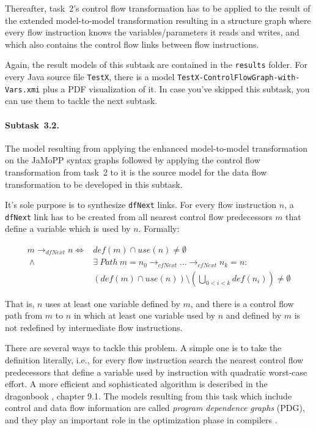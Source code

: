 \documentclass[11pt]{article}
\begin{document}
Thereafter, task~2's control flow transformation has to be applied to the
result of the extended model-to-model transformation resulting in a structure
graph where every flow instruction knows the variables/parameters it reads and
writes, and which also contains the control flow links between flow
instructions.

Again, the result models of this subtask are contained in the \verb|results|
folder.  For every Java source file \verb|TestX|, there is a model
\verb|TestX-ControlFlowGraph-with-Vars.xmi| plus a PDF visualization of it.  In
case you've skipped this subtask, you can use them to tackle the next subtask.


\paragraph{Subtask~3.2.}
\label{sec:subtask-3.2}

The model resulting from applying the enhanced model-to-model transformation on
the JaMoPP syntax graphs followed by applying the control flow transformation
from task~2 to it is the source model for the data flow transformation to be
developed in this subtask.

It's sole purpose is to synthesize \verb|dfNext| links.  For every flow
instruction $n$, a \verb|dfNext| link has to be created from all nearest
control flow predecessors $m$ that define a variable which is used by $n$.
Formally:

\begin{align*}
  m \rightarrow_{dfNext} n  \iff {} & def(m) \cap use(n) \neq \emptyset\\
  ~\land {} & \exists~Path~m = n_0 \rightarrow_{cfNext} ... \rightarrow_{cfNext} n_k = n:\\
  & \left(def(m) \cap use(n)\right) \setminus \left(\bigcup_{0 < i < k}
    def(n_i)\right) \neq \emptyset
\end{align*}

That is, $n$ uses at least one variable defined by $m$, and there is a control
flow path from $m$ to $n$ in which at least one variable used by $n$ and
defined by $m$ is not redefined by intermediate flow instructions.

There are several ways to tackle this problem.  A simple one is to take the
definition literally, i.e., for every flow instruction search the nearest
control flow predecessors that define a variable used by instruction with
quadratic worst-case effort.  A more efficient and sophisticated algorithm is
described in the dragonbook \cite{Aho:CPTT}, chapter 9.1.  The models resulting
from this task which include control and data flow information are called
\emph{program dependence graphs} (PDG), and they play an important role in the
optimization phase in compilers \cite{Ferrante:1987:PDG:24039.24041}.
\end{document}
